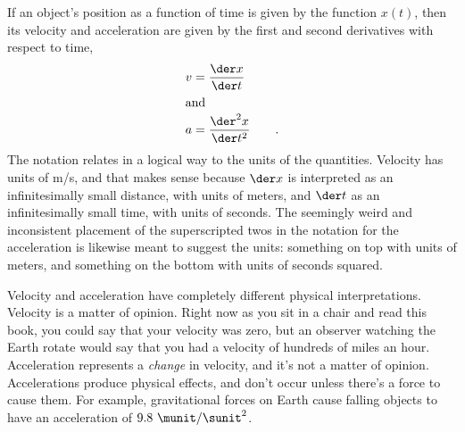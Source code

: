 If an object's position as a function of time is given by the function $x(t)$,
then its velocity and acceleration are given by the first and second derivatives
with respect to time,
\begin{align*}
  v &= \frac{\der x}{\der t} \\
\intertext{and}
  a &= \frac{\der^2 x}{\der t^2} \qquad .
\end{align*}
The notation relates in a logical way to the units of the quantities. Velocity
has units of m/s, and that makes sense because $\der x$ is interpreted as an
infinitesimally small distance, with units of meters, and $\der t$ as an infinitesimally
small time, with units of seconds. The seemingly weird and inconsistent placement of the superscripted twos
in the notation for the acceleration is likewise meant to suggest the units: something on
top with units of meters, and something on the bottom with units of seconds squared.

Velocity and acceleration have completely different physical interpretations.
Velocity is a matter of opinion. Right now as you sit in a chair and read this book,
you could say that your velocity was zero, but an observer watching the Earth rotate
would say that you had a velocity of hundreds of miles an hour. Acceleration represents
a \emph{change} in velocity, and it's not a matter of opinion. Accelerations produce
physical effects, and don't occur unless there's a force to cause them. For example,
gravitational forces on Earth cause falling objects to have an acceleration of $9.8\ \munit/\sunit^2$.

\vspace{0mm plus 15mm}

